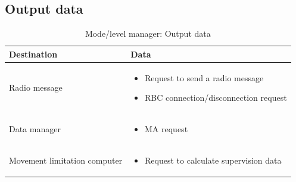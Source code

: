 \documentclass[nocc]{template/openetcs_report}
\begin{document}
\subsection{Output data}
			\begin{longtable}{|l|l|}
				\caption{Mode/level manager: Output data}\\ 
				\hline
				
					\begin{minipage}[t]{0.35\linewidth} \textbf{Destination}	\end{minipage} 
				&	\begin{minipage}[t]{0.65\linewidth} \textbf{Data} \end{minipage} \\
				
				\hline
																																									
					\begin{minipage}[t]{0.35\linewidth} Radio message	\end{minipage} 
				&	\begin{minipage}[t]{0.65\linewidth}
						\begin{itemize}
							\item Request to send a radio message
							\item RBC connection/disconnection request
						\end{itemize}
					\end{minipage} \\
				
				\hline
				
					\begin{minipage}[t]{0.35\linewidth} Data manager	\end{minipage} 
				&	\begin{minipage}[t]{0.65\linewidth}
						\begin{itemize}
							\item MA request
						\end{itemize}			
					\end{minipage} \\
				
				\hline
					
					\begin{minipage}[t]{0.35\linewidth} Movement limitation computer	\end{minipage} 
				&	\begin{minipage}[t]{0.65\linewidth}
						\begin{itemize}
							\item Request to calculate supervision data
						\end{itemize}			
					\end{minipage} \\
				

\end{longtable}
\end{document}
